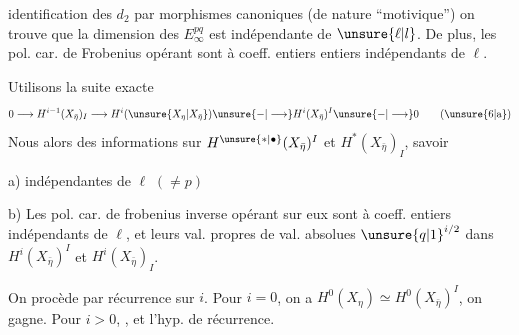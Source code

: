  identification des $d_2$ par morphismes canoniques (de nature ``motivique'') on trouve que la dimension des $E_\infty^{pq}$ est indépendante de $\unsure{\ell|l}$. De plus, les  pol. car. de Frobenius  opérant sont à coeff. entiers entiers indépendants de $\ell$.

Utilisons la suite exacte
\[
0\longrightarrow H^{i-1}(X_{\bar\eta})_I\longrightarrow H^i(\unsure{X_\eta|X_{\bar\eta}})\unsure{-|\longrightarrow}H^i(X_{\bar\eta})^I\unsure{-|\longrightarrow}0
\tag*{(\unsure{6|a})}
\]
Nous   alors des informations sur $H^{\unsure{*|\bullet}}(X_{\bar\eta})^I$ et $H^*(X_{\bar\eta})_I$, savoir

a)  indépendantes de $\ell$ $(\neq p)$

b) Les pol. car. de frobenius inverse opérant sur eux sont à coeff. entiers indépendants de $\ell$, et leurs val. propres  de val. absolues $\unsure{q|1}^{i/2}$ dans $H^i(X_{\bar\eta})^I$ et $H^i(X_{\bar\eta})_I$.


On procède par récurrence sur $i$. Pour $i=0$, on a $H^0(X_\eta)\simeq H^0(X_{\bar\eta})^I$, on gagne. Pour $i>0$,    ,  et l'hyp. de récurrence.
